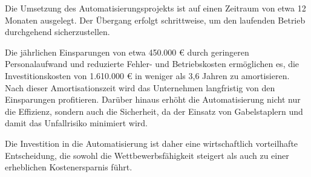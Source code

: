Die Umsetzung des Automatisierungsprojekts ist auf einen Zeitraum von etwa 12 Monaten ausgelegt. Der Übergang erfolgt schrittweise, um den laufenden Betrieb durchgehend sicherzustellen.

Die jährlichen Einsparungen von etwa 450.000 € durch geringeren Personalaufwand und reduzierte Fehler- und Betriebskosten ermöglichen es, die Investitionskosten von 1.610.000 € in weniger als 3,6 Jahren zu amortisieren. Nach dieser Amortisationszeit wird das Unternehmen langfristig von den Einsparungen profitieren. Darüber hinaus erhöht die Automatisierung nicht nur die Effizienz, sondern auch die Sicherheit, da der Einsatz von Gabelstaplern und damit das Unfallrisiko minimiert wird.

Die Investition in die Automatisierung ist daher eine wirtschaftlich vorteilhafte Entscheidung, die sowohl die Wettbewerbsfähigkeit steigert als auch zu einer erheblichen Kostenersparnis führt.




